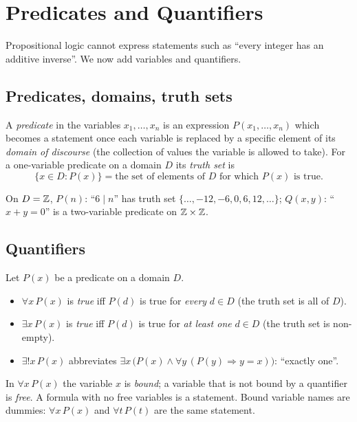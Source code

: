 \chapter{Predicates and Quantifiers}\label{ch:pred}

Propositional logic cannot express statements such as ``every integer has an additive inverse''. We now add variables and quantifiers.

\section{Predicates, domains, truth sets}

\begin{definition}[Predicate]
	A \emph{predicate} in the variables $x_1,\dots,x_n$ is an expression $P(x_1,\dots,x_n)$ which becomes a statement once each variable is replaced by a specific element of its \emph{domain of discourse} (the collection of values the variable is allowed to take). For a one-variable predicate on a domain $D$ its \emph{truth set} is
	\[
	\{x\in D: P(x)\}=\text{the set of elements of $D$ for which $P(x)$ is true.}
	\]
\end{definition}

\begin{example}
	On $D=\mathbb{Z}$, $P(n)$: ``$6\mid n$'' has truth set $\{\dots,-12,-6,0,6,12,\dots\}$; $Q(x,y)$: ``$x+y=0$'' is a two-variable predicate on $\mathbb{Z}\times\mathbb{Z}$.
\end{example}

\section{Quantifiers}

\begin{definition}
	Let $P(x)$ be a predicate on a domain $D$.
	\begin{itemize}
		\item $\forall x\,P(x)$ is \emph{true} iff $P(d)$ is true for \emph{every} $d\in D$ (the truth set is all of $D$).
		\item $\exists x\,P(x)$ is \emph{true} iff $P(d)$ is true for \emph{at least one} $d\in D$ (the truth set is non-empty).
		\item $\exists!x\,P(x)$ abbreviates $\exists x\,\bigl(P(x)\wedge\forall y\,(P(y)\Rightarrow y=x)\bigr)$: ``exactly one''.
	\end{itemize}
	In $\forall x\,P(x)$ the variable $x$ is \emph{bound}; a variable that is not bound by a quantifier is \emph{free}. A formula with no free variables is a statement. Bound variable names are dummies: $\forall x\,P(x)$ and $\forall t\,P(t)$ are the same statement.
\end{definition}

